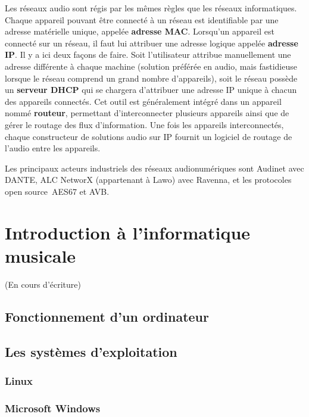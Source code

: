 \documentclass[
]{book}
\begin{document}
Les réseaux audio sont régis par les mêmes règles que les réseaux informatiques. Chaque appareil pouvant être connecté à un réseau est identifiable par une adresse matérielle unique, appelée \textbf{adresse MAC}. Lorsqu'un appareil est connecté sur un réseau, il faut lui attribuer une adresse logique appelée \textbf{adresse IP}. Il y a ici deux façons de faire. Soit l'utilisateur attribue manuellement une adresse différente à chaque machine (solution préférée en audio, mais fastidieuse lorsque le réseau comprend un grand nombre d'appareils), soit le réseau possède un \textbf{serveur DHCP} qui se chargera d'attribuer une adresse IP unique à chacun des appareils connectés. Cet outil est généralement intégré dans un appareil nommé \textbf{routeur}, permettant d'interconnecter plusieurs appareils ainsi que de gérer le routage des flux d'information. Une fois les appareils interconnectés, chaque constructeur de solutions audio sur IP fournit un logiciel de routage de l'audio entre les appareils.

Les principaux acteurs industriels des réseaux audionumériques sont Audinet avec DANTE, ALC NetworX (appartenant à Lawo) avec Ravenna, et les protocoles open source~AES67 et AVB.

\hypertarget{introduction-uxe0-linformatique-musicale}{%
\chapter{Introduction à l'informatique musicale}\label{introduction-uxe0-linformatique-musicale}}

(En cours d'écriture)

\hypertarget{fonctionnement-dun-ordinateur}{%
\section{Fonctionnement d'un ordinateur}\label{fonctionnement-dun-ordinateur}}

\hypertarget{les-systuxe8mes-dexploitation}{%
\section{Les systèmes d'exploitation}\label{les-systuxe8mes-dexploitation}}

\hypertarget{linux}{%
\subsection{Linux}\label{linux}}

\hypertarget{microsoft-windows}{%
\subsection{Microsoft Windows}\label{microsoft-windows}}
\end{document}
